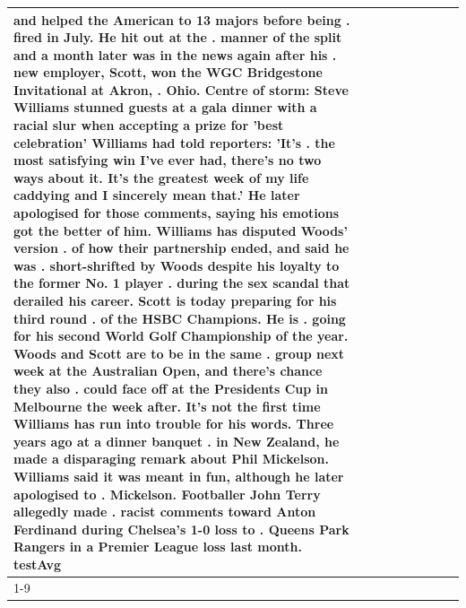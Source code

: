 \begin{table}[H]
\begin{tabular}{lllrlllll}
and helped the American to 13 majors before being . fired in July. He hit out at the . manner of the split and a month later was in the news again after his . new employer, Scott, won the WGC Bridgestone Invitational at Akron, . Ohio. Centre of storm: Steve Williams stunned guests at a gala dinner with a racial slur when accepting a prize for 'best celebration' Williams had told reporters: 'It's . the most satisfying win I've ever had, there's no two ways about it. It's the greatest week of my life caddying and I sincerely mean that.' He later apologised for those comments, saying his emotions got the better of him. Williams has disputed Woods' version . of how their partnership ended, and said he was . short-shrifted by Woods despite his loyalty to the former No. 1 player . during the sex scandal that derailed his career. Scott is today preparing for his third round . of the HSBC Champions. He is . going for his second World Golf Championship of the year. Woods and Scott are to be in the same . group next week at the Australian Open, and there's chance they also . could face off at the Presidents Cup in Melbourne the week after. It's not the first time Williams has run into trouble for his words. Three years ago at a dinner banquet . in New Zealand, he made a disparaging remark about Phil Mickelson. Williams said it was meant in fun, although he later apologised to . Mickelson. Footballer John Terry allegedly made . racist comments toward Anton Ferdinand during Chelsea's 1-0 loss to . Queens Park Rangers in a Premier League loss last month. testAvg \\
\cline{1-9}

\end{tabular}
\end{table}
